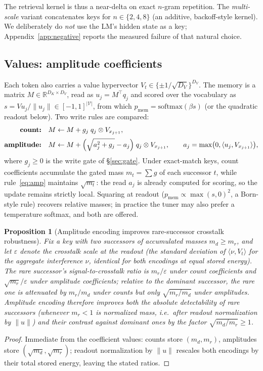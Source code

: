 \documentclass[11pt]{article}
\newtheorem{proposition}{Proposition}
\begin{document}
The retrieval kernel is thus a near-delta on exact $n$-gram repetition. The \emph{multi-scale} variant concatenates keys for $n \in \{2,4,8\}$ (an additive, backoff-style kernel). We deliberately do \emph{not} use the LM's hidden state as a key; Appendix~\ref{app:negative} reports the measured failure of that natural choice.

\subsection{Values: amplitude coefficients}\label{sec:values}

Each token also carries a value hypervector $V_t \in \{\pm 1/\sqrt{D_V}\}^{D_V}$. The memory is a matrix $M \in \mathbb{R}^{D_K \times D_V}$, read as $u_j = M^{\top} q_j$ and scored over the vocabulary as $s = V u_j / \|u_j\|\in[-1,1]^{|\mathcal V|}$, from which $p_{\mathrm{mem}} = \mathrm{softmax}(\beta s)$ (or the quadratic readout below). Two write rules are compared:
\begin{align}
\textbf{count:}\quad & M \leftarrow M + g_j \; q_j \otimes V_{x_{j+1}},\\[2pt]
\textbf{amplitude:}\quad & M \leftarrow M + \Bigl(\sqrt{a_j^2 + g_j} - a_j\Bigr)\; q_j \otimes V_{x_{j+1}},
\qquad a_j = \max\bigl(0, \langle u_j, V_{x_{j+1}}\rangle\bigr),
\label{eq:amp}
\end{align}
where $g_j \ge 0$ is the write gate of \S\ref{sec:gate}. Under exact-match keys, count coefficients accumulate the gated mass $m_t = \sum g$ of each successor $t$, while rule~\eqref{eq:amp} maintains $\sqrt{m_t}$: the read $a_j$ is already computed for scoring, so the update remains strictly local. Squaring at readout ($p_{\mathrm{mem}} \propto \max(s,0)^2$, a Born-style rule) recovers relative masses; in practice the tuner may also prefer a temperature softmax, and both are offered.

\begin{proposition}[Amplitude encoding improves rare-successor crosstalk robustness]\label{prop:amp}
Fix a key with two successors of accumulated masses $m_d \ge m_r$, and let $\varepsilon$ denote the crosstalk scale at the readout (the standard deviation of $\langle \nu, V_t\rangle$ for the aggregate interference $\nu$, identical for both encodings at equal stored energy). The rare successor's signal-to-crosstalk ratio is $m_r/\varepsilon$ under count coefficients and $\sqrt{m_r}/\varepsilon$ under amplitude coefficients; relative to the dominant successor, the rare one is attenuated by $m_r/m_d$ under counts but only $\sqrt{m_r/m_d}$ under amplitudes. Amplitude encoding therefore improves both the absolute detectability of rare successors (whenever $m_r < 1$ is normalized mass, i.e.\ after readout normalization by $\|u\|$) and their contrast against dominant ones by the factor $\sqrt{m_d/m_r}\ge 1$.
\end{proposition}
\begin{proof}
Immediate from the coefficient values: counts store $(m_d, m_r)$, amplitudes store $(\sqrt{m_d}, \sqrt{m_r})$; readout normalization by $\|u\|$ rescales both encodings by their total stored energy, leaving the stated ratios.
\end{proof}
\end{document}
